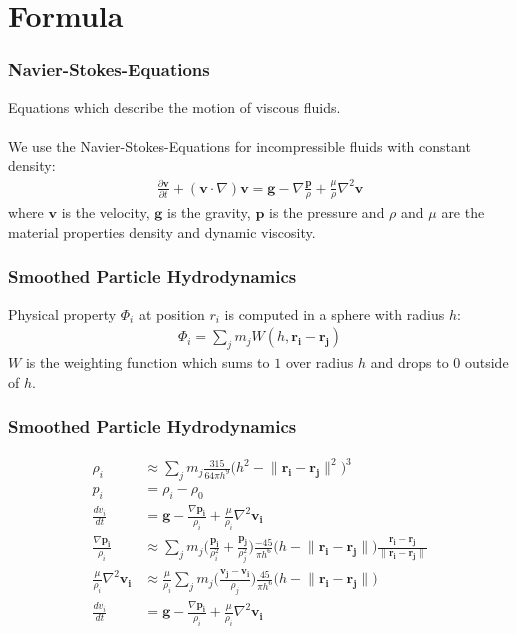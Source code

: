 \documentclass{beamer}
\begin{document}
\section{Formula}
\begin{frame}
    \frametitle{Navier-Stokes-Equations}
    Equations which describe the motion of viscous fluids.\\
    $\qquad$\\
    We use the Navier-Stokes-Equations for incompressible fluids with constant density:\\
    \begin{align*}
        \frac{\partial\boldsymbol{v}}{\partial t} + (\boldsymbol{v} \cdot \nabla )\boldsymbol{v} = 
        \boldsymbol{g} - \nabla \frac{\boldsymbol{p}}{\rho} + \frac{\mu}{\rho}\nabla^2\boldsymbol{v} 
    \end{align*}
    where $\boldsymbol{v}$ is the velocity, $\boldsymbol{g}$ is the gravity,
    $\boldsymbol{p}$ is the pressure and $\rho$ and $\mu$ are the material
    properties density and dynamic viscosity.
\end{frame}

\begin{frame}
    \frametitle{Smoothed Particle Hydrodynamics}
    Physical property $\Phi_i$ at position $r_i$ is computed in a sphere with radius $h$:
    \begin{align*}
        \Phi_i = \sum_j m_j W(h, \boldsymbol{r_i} - \boldsymbol{r_j})
    \end{align*}
    $W$ is the weighting function which sums to $1$ over radius $h$ and drops to $0$ outside of $h$.
\end{frame}

\begin{frame}
    \frametitle{Smoothed Particle Hydrodynamics}
    \begin{align*}
        \rho_i &\approx \sum_j m_j \frac{315}{64\pi h^9} \big(h^2-\lVert \boldsymbol{r_i} - \boldsymbol{r_j} \rVert^2\big)^3\\
        p_i &= \rho_i - \rho_0\\
        \frac{dv_i}{dt} &= \boldsymbol{g} -  \frac{\nabla\boldsymbol{p_i}}{\rho_i} + \frac{\mu}{\rho_i}\nabla^2\boldsymbol{v_i}\\
        \frac{\nabla\boldsymbol{p_i}}{\rho_i} &\approx \sum_j m_j \bigg( \frac{\boldsymbol{p_i}}{\rho_i^2} + \frac{\boldsymbol{p_j}}{\rho_j^2}\bigg) 
        \frac{-45}{\pi h^6} \big(h-\lVert\boldsymbol{r_i} - \boldsymbol{r_j}\rVert\big) \frac{\boldsymbol{r_i} - \boldsymbol{r_j}}{\lVert \boldsymbol{r_i} - \boldsymbol{r_j}\rVert}\\
        \frac{\mu}{\rho_i}\nabla^2\boldsymbol{v_i} &\approx \frac{\mu}{\rho_i}\sum_j m_j \bigg(\frac{\boldsymbol{v_j} - \boldsymbol{v_i}}{\rho_j}\bigg)
        \frac{45}{\pi h^6}\big(h - \lVert\boldsymbol{r_i} - \boldsymbol{r_j}\rVert\big)\\
        \frac{dv_i}{dt} &= \boldsymbol{g} -  \frac{\nabla\boldsymbol{p_i}}{\rho_i} + \frac{\mu}{\rho_i}\nabla^2\boldsymbol{v_i}
    \end{align*}
\end{frame}
\end{document}
